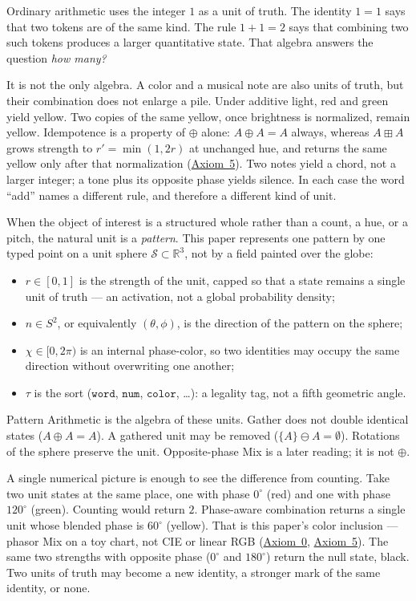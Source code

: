 \documentclass[12pt, a4paper]{article}
\begin{document}
Ordinary arithmetic uses the integer $1$ as a unit of truth.
The identity $1=1$ says that two tokens are of the same kind.
The rule $1+1=2$ says that combining two such tokens produces a
larger quantitative state. That algebra answers the question
\emph{how many?}

It is not the only algebra. A color and a musical note are also
units of truth, but their combination does not enlarge a pile.
Under additive light, red and green yield yellow. Two copies of
the same yellow, once brightness is normalized, remain yellow.
Idempotence is a property of $\oplus$ alone: $A\oplus A=A$ always,
whereas $A\boxplus A$ grows strength to $r'=\min(1,2r)$ at unchanged
hue, and returns the same yellow only after that normalization
(\hyperref[subsec:axiom_interference]{Axiom~5}).
Two notes yield a chord, not a larger integer; a tone plus its
opposite phase yields silence. In each case the word ``add''
names a different rule, and therefore a different kind of unit.

When the object of interest is a structured whole rather than a
count, a hue, or a pitch, the natural unit is a \emph{pattern}.
This paper represents one pattern by one typed point on a unit
sphere $\mathcal{S} \subset \mathbb{R}^3$, not by a field painted over the globe:
\begin{itemize}
    \item $r \in [0, 1]$ is the strength of the unit, capped so that a state remains a single unit of truth --- an activation, not a global probability density;
    \item $\hat n \in S^2$, or equivalently $(\theta, \phi)$, is the direction of the pattern on the sphere;
    \item $\chi \in [0, 2\pi)$ is an internal phase-color, so two identities may occupy the same direction without overwriting one another;
    \item $\tau$ is the sort ($\mathtt{word}$, $\mathtt{num}$, $\mathtt{color}$, \ldots): a legality tag, not a fifth geometric angle.
\end{itemize}
Pattern Arithmetic is the algebra of these units. Gather does not double identical states ($A \oplus A = A$). A gathered unit may be removed ($\{A\} \ominus A = \emptyset$). Rotations of the sphere preserve the unit. Opposite-phase Mix is a later reading; it is not $\oplus$.

A single numerical picture is enough to see the difference from counting. Take two unit states at the same place, one with phase $0^\circ$ (red) and one with phase $120^\circ$ (green). Counting would return $2$. Phase-aware combination returns a single unit whose blended phase is $60^\circ$ (yellow). That is this paper's color inclusion --- phasor Mix on a toy chart, not CIE or linear RGB (\hyperref[subsec:axiom0_admissibility]{Axiom~0}, \hyperref[subsec:axiom_interference]{Axiom~5}). The same two strengths with opposite phase ($0^\circ$ and $180^\circ$) return the null state, black. Two units of truth may become a new identity, a stronger mark of the same identity, or none.
\end{document}
